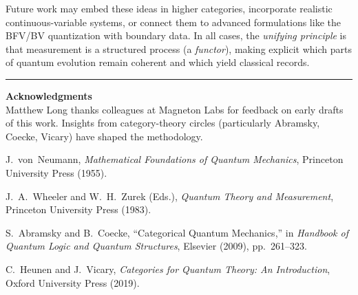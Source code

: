 \documentclass[12pt]{article}
\begin{document}
Future work may embed these ideas in higher categories, incorporate realistic continuous-variable systems, 
or connect them to advanced formulations like the BFV/BV quantization with boundary data. In all cases, 
the \emph{unifying principle} is that measurement is a structured process (a \emph{functor}), 
making explicit which parts of quantum evolution remain coherent and which yield classical records.

\vspace{1em}
\hrule
\vspace{1em}

\noindent\textbf{Acknowledgments} \\
Matthew Long thanks colleagues at Magneton Labs for feedback on early drafts of this work. 
Insights from category-theory circles (particularly Abramsky, Coecke, Vicary) have shaped the methodology.

\vspace{1em}

\begin{thebibliography}{9}

J.~von~Neumann, 
\emph{Mathematical Foundations of Quantum Mechanics}, 
Princeton University Press (1955).

J.~A.~Wheeler and W.~H.~Zurek (Eds.), 
\emph{Quantum Theory and Measurement}, 
Princeton University Press (1983).

S.~Abramsky and B.~Coecke, 
``Categorical Quantum Mechanics,'' 
in \emph{Handbook of Quantum Logic and Quantum Structures}, 
Elsevier (2009), pp.~261--323.

C.~Heunen and J.~Vicary,
\emph{Categories for Quantum Theory: An Introduction},
Oxford University Press (2019).

\end{thebibliography}
\end{document}
